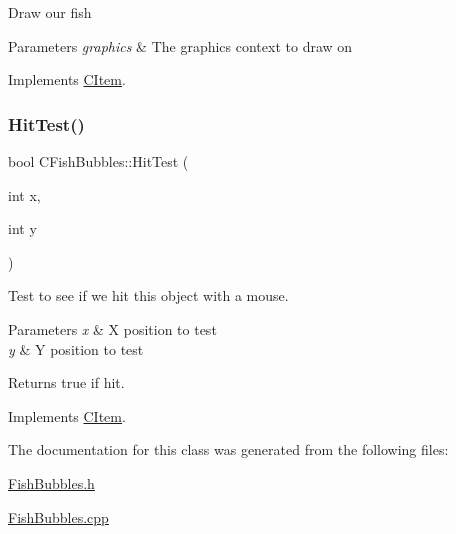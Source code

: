 Draw our fish 
\begin{DoxyParams}{Parameters}
{\em graphics} & The graphics context to draw on \\
\hline
\end{DoxyParams}


Implements \mbox{\hyperlink{class_c_item_a7ef8448d0c4bc53d0f1943a4dc817f6f}{C\+Item}}.

\mbox{\label{class_c_fish_bubbles_a34b8f3c613f04b7ef9a06a6fcbce5be2}} 
\subsubsection{\texorpdfstring{HitTest()}{HitTest()}}
{\footnotesize\ttfamily bool C\+Fish\+Bubbles\+::\+Hit\+Test (\begin{DoxyParamCaption}\item[{int}]{x,  }\item[{int}]{y }\end{DoxyParamCaption})\hspace{0.3cm}{\ttfamily [virtual]}}

Test to see if we hit this object with a mouse. 
\begin{DoxyParams}{Parameters}
{\em x} & X position to test \\
\hline
{\em y} & Y position to test \\
\hline
\end{DoxyParams}
\begin{DoxyReturn}{Returns}
true if hit. 
\end{DoxyReturn}


Implements \mbox{\hyperlink{class_c_item_a8bd4f5e3f2eb2487125dd435719484e8}{C\+Item}}.



The documentation for this class was generated from the following files\+:\begin{DoxyCompactItemize}
\item 
\mbox{\hyperlink{_fish_bubbles_8h}{Fish\+Bubbles.\+h}}\item 
\mbox{\hyperlink{_fish_bubbles_8cpp}{Fish\+Bubbles.\+cpp}}\end{DoxyCompactItemize}
